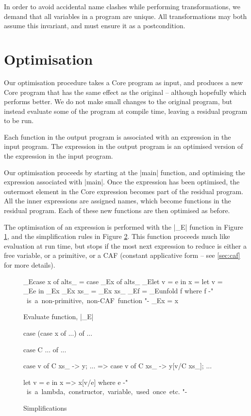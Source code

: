 \documentclass{llncs}
\begin{document}
In order to avoid accidental name clashes while performing transformations, we demand that all variables in a program are unique. All transformations may both assume this invariant, and must ensure it as a postcondition.

\section{Optimisation}

Our optimisation procedure takes a Core program as input, and produces a new Core program that has the same effect as the original -- although hopefully which performs better. We do not make small changes to the original program, but instead evaluate some of the program at compile time, leaving a residual program to be run.

Each function in the output program is associated with an expression in the input program. The expression in the output program is an optimised version of the expression in the input program.

Our optimisation proceeds by starting at the |main| function, and optimising the expression associated with |main|. Once the expression has been optimised, the outermost element in the Core expression becomes part of the residual program. All the inner expressions are assigned names, which become functions in the residual program. Each of these new functions are then optimised as before.

The optimisation of an expression is performed with the |_E| function in Figure \ref{fig:evaluate}, and the simplification rules in Figure \ref{fig:simplify}. This function proceeds much like evaluation at run time, but stops if the most next expression to reduce is either a free variable, or a primitive, or a CAF (constant applicative form -- see \ref{sec:caf} for more details).


\begin{figure}[tb]
\begin{code}
_E\<case x of alts_  \> =  case _E\<x\> of alts_
_E\<let v = e in x   \> =  let v = _E\<e\> in _E\<x\>
_E\<x xs_            \> =  _E\<x\> xs_
_E\<f                \> =  _E\<unfold f\>
                           where f {-" \hbox{ is a non-primitive, non-CAF function} "-}
_E\<x                \> =  x
\end{code}
\caption{Evaluate function, |_E|}
\label{fig:evaluate}
\end{figure}

\begin{figure}[tb]
\begin{code}
case (case x of ...) of ...

case C ... of ...

case v of {C xs_ -> y; ...} => case v of {C xs_ -> y[v/C xs_]; ...}

let v = e in x => x[v/e]
   where e {-" \hbox{ is a lambda, constructor, variable, used once etc.} "-}
\end{code}
\caption{Simplifications}
\label{fig:simplify}
\end{figure}
\end{document}

